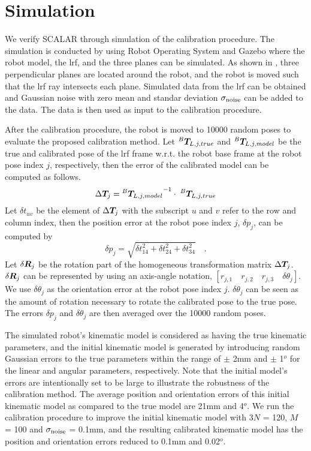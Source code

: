 \section{Simulation}
\label{sec:simulation}

We verify SCALAR through simulation of the calibration procedure. The simulation is conducted by using Robot Operating System and Gazebo where the robot model, the \ac{lrf}, and the three planes can be simulated.  
As shown in , three perpendicular planes are located around the robot, and the robot is moved such that the \ac{lrf} ray intersects each plane. Simulated data from the \ac{lrf} can be obtained and Gaussian noise with zero mean and standar deviation $\sigma_{\rm{noise}}$ can be added to the data. The data is then used as input to the calibration procedure. 

After the calibration procedure, the robot is moved to 10000 random poses to evaluate the proposed calibration method. Let ${^B}\vb*{T}_{L,j,true}$ and ${^B}\vb*{T}_{L,j,model}$ be the true and calibrated pose of the \ac{lrf} frame w.r.t. the robot base frame at the robot pose index $j$, respectively, then the error of the calibrated model can be computed as follows. 
\begin{equation}
\Delta \vb*{T}_j =  {{^B}\vb*{T}_{L,j,model}}^{-1} \cdot\; {^B}\vb*{T}_{L,j,true}
\end{equation}
Let $\delta t_{uv}$ be the element of $\Delta \vb*{T}_j$ with the subscript $u$ and $v$ refer to the row and column index, then the position error at the robot pose index $j$, $\delta p_j$, can be computed by
\begin{equation}
\delta p_j = \sqrt{\delta t_{14}^2 + \delta t_{24}^2 + \delta t_{34}^2} \quad .
\end{equation}
Let $\delta \vb*{R}_j$ be the rotation part of the homogeneous transformation matrix $\Delta \vb*{T}_j$. $\delta \vb*{R}_j$ can be represented by using an axis-angle notation, $[r_{j,1}\quad r_{j,2}\quad r_{j,3}\quad \delta \theta_j]$. We use $\delta\theta_j$ as the orientation error at the robot pose index $j$.  $\delta\theta_j$ can be seen as the amount of rotation necessary to rotate the calibrated pose to the true pose. The errors $\delta p_j$ and $\delta\theta_j$ are then averaged over the 10000 random poses.

The simulated robot's kinematic model is considered as having the true kinematic parameters, and the initial kinematic model is generated by introducing random Gaussian errors to the true parameters within the range of $\pm$ 2mm and $\pm$ 1$^o$ for the linear and angular parameters, respectively. Note that the initial model's errors are intentionally set to be large to illustrate the robustness of the calibration method. The average position and orientation errors of this initial kinematic model as compared to the true model are 21mm and 4$^o$. We run the calibration procedure to improve the initial kinematic model with $3N$ = 120, $M$ = 100 and $\sigma_{\rm{noise}}$ = 0.1mm, and the resulting calibrated kinematic model has the position and orientation errors reduced to 0.1mm and 0.02$^o$.

